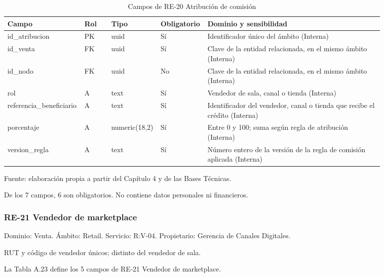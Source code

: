 \documentclass[11pt]{article}
\begin{document}
\begin{table}[htbp]
\caption{Campos de RE-20 Atribución de comisión}\label{tab:d_re20}
\centering
\begin{tabular}{@{}p{0.167\linewidth}p{0.070\linewidth}p{0.079\linewidth}p{0.097\linewidth}p{0.465\linewidth}@{}}
\toprule Campo & Rol & Tipo & Obligatorio & Dominio y sensibilidad \\
\midrule
id\_atribucion & PK & uuid & Sí & Identificador único del ámbito (Interna) \\
id\_venta & FK & uuid & Sí & Clave de la entidad relacionada, en el mismo ámbito (Interna) \\
id\_nodo & FK & uuid & No & Clave de la entidad relacionada, en el mismo ámbito (Interna) \\
rol & A & text & Sí & Vendedor de sala, canal o tienda (Interna) \\
referencia\_beneficiario & A & text & Sí & Identificador del vendedor, canal o tienda que recibe el crédito (Interna) \\
porcentaje & A & numeric(18,2) & Sí & Entre 0 y 100; suma según regla de atribución (Interna) \\
version\_regla & A & text & Sí & Número entero de la versión de la regla de comisión aplicada (Interna) \\
\bottomrule
\end{tabular}
\par\smallskip
{\raggedright Fuente: elaboración propia a partir del Capítulo 4 y de las Bases Técnicas.\par}
\end{table}


De los 7 campos, 6 son obligatorios. No contiene datos personales ni financieros.

\subsubsection{RE-21 Vendedor de marketplace}

Dominio: Venta. Ámbito: Retail. Servicio: R:V-04. Propietario: Gerencia de Canales Digitales.

RUT y código de vendedor únicos; distinto del vendedor de sala.

La Tabla A.23 define los 5 campos de RE-21 Vendedor de marketplace.
\end{document}
